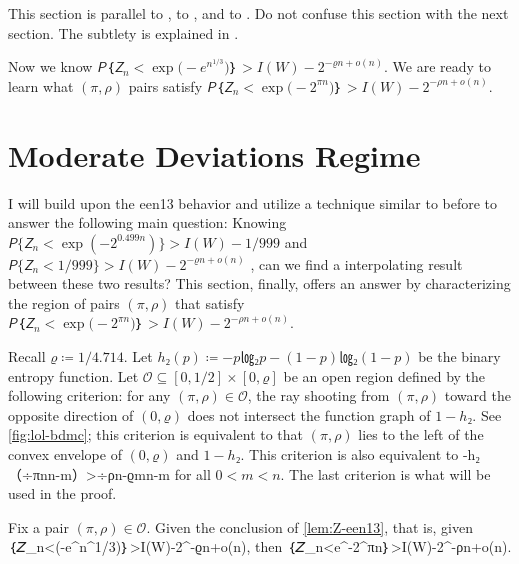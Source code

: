 \documentclass[openany]{amsbook}
\makeatletter
\numberwithin{equation}{chapter}
\numberwithin{figure}{chapter}
\numberwithin{table}{chapter}
\def\bigl@C#1{\bigl#1}					\def\bigr@C#1{\bigr#1}
\def\({\bigl@C(}	\def\){\bigr@C)}	令（{\Bigl(}			令）{\Bigr)}
\def\[#1\]{\begin{equation*}{#1}\end{equation*}}
\theoremstyle{definition}	理dfn:Definition~?s			理exa:Example~?s
\theoremstyle{remark}		理cla:Claim~?s				理rem:Remark~?s
\def\tagcopy#1{\tag{\eqref{#1}'s copy}}
\makeatother
\begin{document}
	This section is parallel to \cite[section~V]{LargeDeviations18},
	to \cite[appendix~C.C]{Hypotenuse19}, and to \cite[section~10.2]{GRY19}.
	Do not confuse this section with the next section.
	The subtlety is explained in \cite[section~III]{LargeDeviations18}.
	
	Now we know $𝘗｛𝘡_n<\exp\(-e^{n^{1/3}}\)｝>I(W)-2^{-ϱn+o(n)}$.
	We are ready to learn what $(π,ρ)$ pairs satisfy
	$𝘗｛𝘡_n<\exp\(-2^{πn}\)｝>I(W)-2^{-ρn+o(n)}$.

\section{Moderate Deviations Regime}

	I will build upon the een13 behavior and utilize a technique
	similar to before to answer the following main question:
	Knowing $𝘗\{𝘡_n<\exp(-2^{0.499n})\}>I(W)-1/999$ \cite{AT09}
	and $𝘗\{𝘡_n<1/999\}>I(W)-2^{-ϱn+o(n)}$ \cite{MHU16},
	can we find a interpolating result between these two results?
	This section, finally, offers an answer by characterizing the region
	of pairs $(π,ρ)$ that satisfy $𝘗｛𝘡_n<\exp\(-2^{πn}\)｝>I(W)-2^{-ρn+o(n)}$.
	
	Recall $ϱ≔1/4.714$.
	Let $h₂(p)≔-p㏒₂p-(1-p)㏒₂(1-p)$ be the binary entropy function.
	Let $𝒪⊆[0,1/2]×[0,ϱ]$ be an open region defined by the following criterion:
	for any $(π,ρ)∈𝒪$, the ray shooting from $(π,ρ)$ toward the opposite direction
	of $(0,ϱ)$ does not intersect the function graph of $1-h₂$.
	See \cref{fig:lol-bdmc};
	this criterion is equivalent to that $(π,ρ)$ lies to the left
	of the convex envelope of $(0,ϱ)$ and $1-h₂$.
	This criterion is also equivalent to
	\[1-h₂（÷{πn}{n-m}）>÷{ρn-ϱm}{n-m}\label{ine:ray-raw}\]
	for all $0<m<n$.
	The last criterion is what will be used in the proof.
	
	\begin{thm}\label{thm:Z-e2pin}
		Fix a pair $(π,ρ)∈𝒪$.
		Given the conclusion of \cref{lem:Z-een13}, that is, given
		\[𝘗｛𝘡_n<\exp\(-e^{n^{1/3}}\)｝>I(W)-2^{-ϱn+o(n)},\tagcopy{ine:Z-een13}\]
		then
		\[𝘗｛𝘡_n<e^{-2^{πn}}｝>I(W)-2^{-ρn+o(n)}.\label{ine:Z-e2pin}\]
	\end{thm}
	
\end{document}
